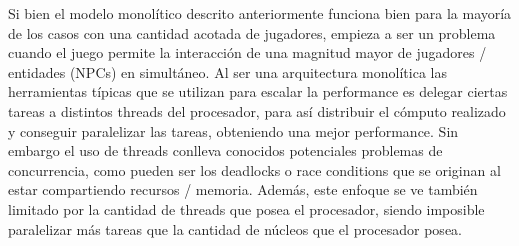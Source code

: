 
Si bien el modelo monolítico descrito anteriormente funciona bien para la mayoría de los 
casos con una cantidad acotada de jugadores, empieza a ser un problema cuando el juego 
permite la interacción de una magnitud mayor de jugadores / entidades (NPCs) en simultáneo. 
Al ser una arquitectura monolítica las herramientas típicas que se utilizan para escalar 
la performance es delegar ciertas tareas a distintos threads del procesador, para así distribuir 
el cómputo realizado y conseguir paralelizar las tareas, obteniendo una mejor performance. 
Sin embargo el uso de threads conlleva conocidos potenciales problemas de concurrencia, 
como pueden ser los deadlocks o race conditions que se originan al estar compartiendo 
recursos / memoria. Además, este enfoque se ve también limitado por la cantidad de threads 
que posea el procesador, siendo imposible paralelizar más tareas que la cantidad de núcleos 
que el procesador posea.
